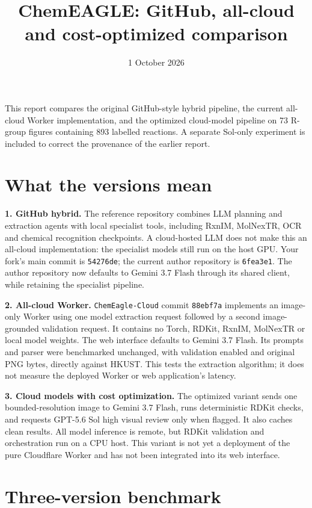 \documentclass[11pt,a4paper]{article}
\title{ChemEAGLE: GitHub, all-cloud and cost-optimized comparison}
\author{}
\date{1 October 2026}
\begin{document}
\maketitle
\thispagestyle{empty}

This report compares the original GitHub-style hybrid pipeline, the current all-cloud Worker implementation, and the optimized cloud-model pipeline on 73 R-group figures containing 893 labelled reactions. A separate Sol-only experiment is included to correct the provenance of the earlier report.

\section{What the versions mean}

\textbf{1. GitHub hybrid.} The reference repository combines LLM planning and extraction agents with local specialist tools, including RxnIM, MolNexTR, OCR and chemical recognition checkpoints. A cloud-hosted LLM does not make this an all-cloud implementation: the specialist models still run on the host GPU. Your fork's main commit is \texttt{54276de}; the current author repository is \texttt{6fea3e1}. The author repository now defaults to Gemini 3.7 Flash through its shared client, while retaining the specialist pipeline.

\textbf{2. All-cloud Worker.} \texttt{ChemEagle-Cloud} commit \texttt{88ebf7a} implements an image-only Worker using one model extraction request followed by a second image-grounded validation request. It contains no Torch, RDKit, RxnIM, MolNexTR or local model weights. The web interface defaults to Gemini 3.7 Flash. Its prompts and parser were benchmarked unchanged, with validation enabled and original PNG bytes, directly against HKUST. This tests the extraction algorithm; it does not measure the deployed Worker or web application's latency.

\textbf{3. Cloud models with cost optimization.} The optimized variant sends one bounded-resolution image to Gemini 3.7 Flash, runs deterministic RDKit checks, and requests GPT-5.6 Sol high visual review only when flagged. It also caches clean results. All model inference is remote, but RDKit validation and orchestration run on a CPU host. This variant is not yet a deployment of the pure Cloudflare Worker and has not been integrated into its web interface.

\section{Three-version benchmark}
\end{document}
